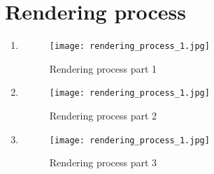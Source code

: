 \section{Rendering process}
\begin{enumerate}
    \item
        \begin{figure}[H]
          \texttt{[image: rendering\_process\_1.jpg]}
          \caption{Rendering process part 1}
        \end{figure}
    \item
        \begin{figure}[H]
          \texttt{[image: rendering\_process\_1.jpg]}
          \caption{Rendering process part 2}
        \end{figure}
    \item
        \begin{figure}[H]
          \texttt{[image: rendering\_process\_1.jpg]}
          \caption{Rendering process part 3}
        \end{figure}
\end{enumerate}